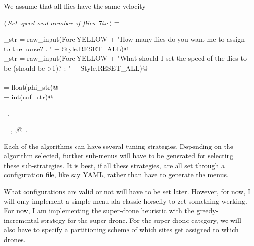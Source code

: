 \documentclass[11.5pt]{report}
\begin{document}
\vspace{-0.8cm} \newchunk We assume that all flies have the same velocity
\begin{flushleft} \small
\begin{minipage}{\linewidth}\label{scrap104}\raggedright\small
{} $\langle\,${\itshape Set speed and number of flies}\nobreak\ {\footnotesize {74c}}$\,\rangle\equiv$
\vspace{-1ex}
\begin{list}{}{} \item
\mbox{}\verb@nof_str = raw_input(Fore.YELLOW + "How many flies do you want me to assign to the horse? : " + Style.RESET_ALL)@\\
\mbox{}\verb@phi_str = raw_input(Fore.YELLOW + "What should I set the speed of the flies to be (should be >1)? : " + Style.RESET_ALL)@\\
\mbox{}\verb@@\\
\mbox{}\verb@phi = float(phi_str)@\\
\mbox{}\verb@nof = int(nof_str)@\\
\mbox{}\verb@@{\NWsep}
\end{list}
\vspace{-1.5ex}
\footnotesize
\begin{list}{}{\setlength{\itemsep}{-\parsep}\setlength{\itemindent}{-\leftmargin}}
\item \NWtxtMacroRefIn\ .
\item \NWtxtIdentsDefed\nobreak\  \verb@nof@\nobreak\ , \verb@phi,@\nobreak\ .
\item{}
\end{list}
\end{minipage}\vspace{4ex}
\end{flushleft}



\vspace{-0.8cm} \newchunk Each of the algorithms can have several tuning strategies. 
Depending on the algorithm selected, further sub-menus will have to be generated for 
selecting these sub-strategies. It is best, if all these strategies, are all set 
through a configuration file, like say YAML, rather than have to generate the menus. 

What configurations are valid or not will have to be set later. However, for now, I 
will only implement a simple menu ala classic horsefly to get something working. 
For now, I am implementing the super-drone heuristic with the greedy-incremental 
strategy for the super-drone. For the super-drone category, we will also have 
to specify a partitioning scheme of which sites get assigned to which drones. 
\end{document}
